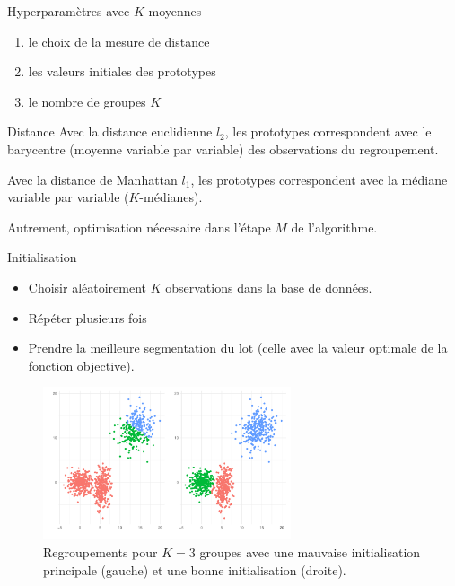 \documentclass[
  ignorenonframetext,
]{beamer}
\providecommand{\tightlist}{%
  \setlength{\itemsep}{0pt}\setlength{\parskip}{0pt}}\usepackage{longtable,booktabs,array}
\begin{document}
\begin{frame}{Hyperparamètres avec \(K\)-moyennes}
\protect\hypertarget{hyperparamuxe8tres-avec-k-moyennes}{}
\begin{enumerate}
\tightlist
\item
  le choix de la mesure de distance
\item
  les valeurs initiales des prototypes
\item
  le nombre de groupes \(K\)
\end{enumerate}
\end{frame}

\begin{frame}{Distance}
\protect\hypertarget{distance}{}
Avec la distance euclidienne \(l_2\), les prototypes correspondent avec
le barycentre (moyenne variable par variable) des observations du
regroupement.

Avec la distance de Manhattan \(l_1\), les prototypes correspondent avec
la médiane variable par variable (\(K\)-médianes).

Autrement, optimisation nécessaire dans l'étape \(M\) de l'algorithme.
\end{frame}

\begin{frame}{Initialisation}
\protect\hypertarget{initialisation}{}
\footnotesize

\begin{itemize}
\tightlist
\item
  Choisir aléatoirement \(K\) observations dans la base de données.
\item
  Répéter plusieurs fois
\item
  Prendre la meilleure segmentation du lot (celle avec la valeur
  optimale de la fonction objective).
\end{itemize}

\begin{figure}

{\centering \includegraphics[width=0.65\textwidth,height=\textheight]{MATH60602-diapos11_files/figure-beamer/fig-kmoyenne-mauvais-1.pdf}

}

\caption{\label{fig-kmoyenne-mauvais}Regroupements pour \(K=3\) groupes
avec une mauvaise initialisation principale (gauche) et une bonne
initialisation (droite).}

\end{figure}
\end{frame}
\end{document}
